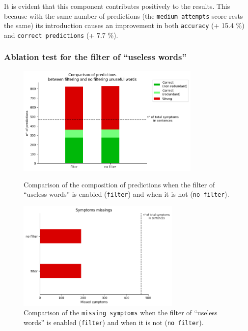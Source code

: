 
It is evident that this component contributes positively to the results. This because with the same number of predictions (the \texttt{medium attempts} score rests the same) its introduction causes an improvement in both \texttt{accuracy} (+ 15.4 \%) and \texttt{correct predictions} (+ 7.7 \%).


\newpage
\subsubsection{Ablation test for the filter of ``useless words''}
\begin{figure}[h]%
  \centering
  \begin{minipage}[b]{0.4\textwidth}
    \includegraphics[width=9cm]{graphs/comparison_filtering}
    \caption{Comparison of the composition of predictions when the filter of ``useless words'' is enabled (\texttt{filter}) and when it is not (\texttt{no filter}).}
  \end{minipage}
  \hfill
  \begin{minipage}[b]{0.4\textwidth}
    \includegraphics[width=8cm]{graphs/comparison_filtering_missings}
    \caption{Comparison of the \texttt{missing symptoms} when the filter of ``useless words'' is enabled (\texttt{filter}) and when it is not (\texttt{no filter}).}
  \end{minipage}
\end{figure}

